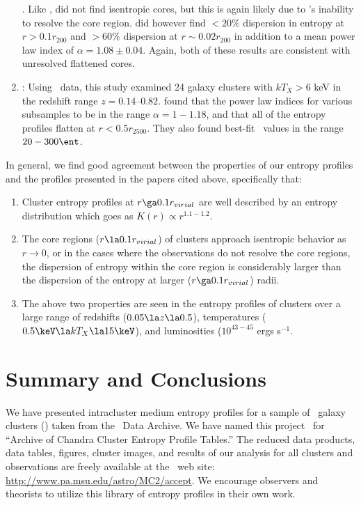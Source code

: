 \documentclass{emulateapj}
\begin{document}
\begin{enumerate}
  \xmm. Like \citet{piffaretti05}, \citet{pratt06} did not find
  isentropic cores, but this is again likely due to \xmm's inability
  to resolve the core region. \citet{pratt06} did however find $<
  20\%$ dispersion in entropy at $r > 0.1r_{200}$ and $> 60\%$
  dispersion at $r \sim 0.02r_{200}$ in addition to a mean power law
  index of $\alpha = 1.08 \pm 0.04$. Again, both of these results are
  consistent with unresolved flattened cores.
\item \citet{morandi07}: Using \chandra\ data, this study examined 24
  galaxy clusters with $kT_X > 6$ keV in the redshift range
  $z=0.14–0.82$. \citet{morandi07} found that the power law indices
  for various subsamples to be in the range $\alpha=1-1.18$, and that
  all of the entropy profiles flatten at $r < 0.5r_{2500}$. They also
  found best-fit \kna\ values in the range $20-300 \ent$.
\end{enumerate}

In general, we find good agreement between the properties of our
entropy profiles and the profiles presented in the papers cited above,
specifically that:
\begin{enumerate}
\item Cluster entropy profiles at $r \ga 0.1 r_{virial}$ are well
  described by an entropy distribution which goes as $K(r) \propto
  r^{1.1-1.2}$.
\item The core regions ($r \la 0.1 r_{virial}$) of clusters approach
  isentropic behavior as $r \rightarrow 0$, or in the cases where the
  observations do not resolve the core regions, the dispersion of
  entropy within the core region is considerably larger than the
  dispersion of the entropy at larger ($r \ga 0.1 r_{virial}$) radii.
\item The above two properties are seen in the entropy profiles of
  clusters over a large range of redshifts ($0.05 \la z \la 0.5$),
  temperatures ($0.5 \keV \la kT_X \la 15 \keV$), and luminosities
  ($10^{43-45}$ ergs s$^{-1}$.
\end{enumerate}  

\section{Summary and Conclusions}
\label{sec:summary}

We have presented intracluster medium entropy profiles for a sample of
\numcluster\ galaxy clusters (\expt) taken from the \chandra\ Data
Archive. We have named this project \accept\ for ``Archive of Chandra
Cluster Entropy Profile Tables.'' The reduced data products, data
tables, figures, cluster images, and results of our analysis for all
clusters and observations are freely available at the \accept\ web
site: \url{http://www.pa.msu.edu/astro/MC2/accept}. We encourage
observers and theorists to utilize this library of entropy profiles in
their own work.
\end{document}
